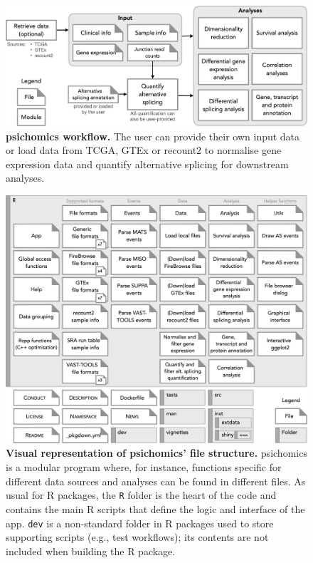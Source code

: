 \begin{figure}[!ht]
  \includegraphics[width=.94\textwidth]{images/psichomics/workflow}
  \centering
  \caption[psichomics workflow]{\textbf{psichomics workflow.} The user can provide their own input data or load data from TCGA, GTEx or recount2 to normalise gene expression data and quantify alternative splicing for downstream analyses.}
  \label{fig:psichomics-workflow}
\end{figure}

\begin{figure}[!ht]
  \includegraphics[width=\textwidth]{images/psichomics/file-structure}
  \centering
  \caption[psichomics file structure]{\textbf{Visual representation of psichomics' file structure.} psichomics is a modular program where, for instance, functions specific for different data sources and analyses can be found in different files. As usual for R packages, the \texttt{R} folder is the heart of the code and contains the main R scripts that define the logic and interface of the app. \texttt{dev} is a non-standard folder in R packages used to store supporting scripts (e.g., test workflows); its contents are not included when building the R package.}
  \label{fig:psichomics-file-structure}
\end{figure}

